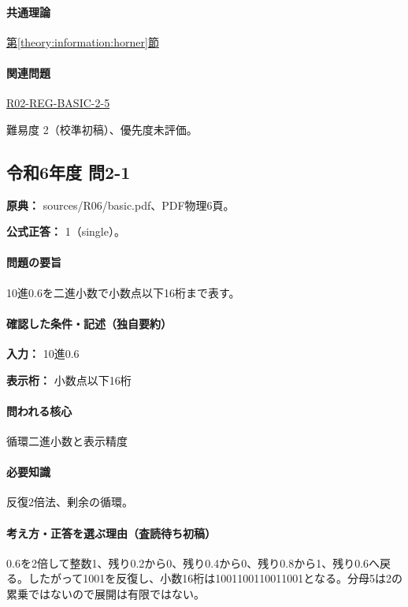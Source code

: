 \paragraph{共通理論} \hyperref[theory:information:horner]{第\ref*{theory:information:horner}節}

\paragraph{関連問題} \hyperref[q:r02-reg-basic-2-5]{R02-REG-BASIC-2-5}

\par 難易度 2（校準初稿）、優先度未評価。

\subsection{令和6年度 問2-1}
\label{q:r06-reg-basic-2-1}

\noindent\textbf{原典：} sources/R06/basic.pdf、PDF物理6頁。

\textbf{公式正答：} 1（single）。

\paragraph{問題の要旨} 10進0.6を二進小数で小数点以下16桁まで表す。

\paragraph{確認した条件・記述（独自要約）}\mbox{}\par

\noindent\textbf{入力：} 10進0.6\par

\noindent\textbf{表示桁：} 小数点以下16桁\par

\paragraph{問われる核心} 循環二進小数と表示精度

\paragraph{必要知識} 反復2倍法、剰余の循環。

\paragraph{考え方・正答を選ぶ理由（査読待ち初稿）} 0.6を2倍して整数1、残り0.2から0、残り0.4から0、残り0.8から1、残り0.6へ戻る。したがって1001を反復し、小数16桁は1001100110011001となる。分母5は2の累乗ではないので展開は有限ではない。

